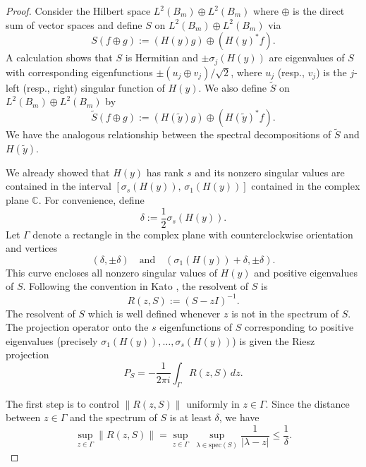 \documentclass[11pt]{article}
\theoremstyle{definition}
\numberwithin{theorem}{section}
\numberwithin{lemma}{section}
\numberwithin{equation}{section}
\def\C{\mathbb{C}}
\renewcommand{\tilde}{\widetilde}
\def\andspace{\quad\text{and}\quad}
\numberwithin{equation}{section}
\begin{document}
\begin{proof}
		Consider the Hilbert space $L^2(B_m)\oplus L^2(B_m)$ where $\oplus$ is the direct sum of vector spaces and define $S$ on $L^2(B_m)\oplus L^2(B_m)$ via 
		$$
		S(f\oplus g):= (H(y) g) \oplus (H(y)^* f).
		$$
		A calculation shows that $S$ is Hermitian and $\pm \sigma_j(H(y))$ are eigenvalues of $S$ with corresponding eigenfunctions $\pm (u_j \oplus v_j)/\sqrt 2$, where $u_j$ (resp., $v_j$) is the $j$-left (resp., right) singular function of $H(y)$. We also define $\tilde S$ on $L^2(B_m)\oplus L^2(B_m)$ by 
		$$
		\tilde S(f\oplus g):= (H(\tilde y) g) \oplus (H(\tilde y)^* f).
		$$
		We have the analogous relationship between the spectral decompositions of $\tilde S$ and $H(\tilde y)$. 
		
		We already showed that $H(y)$ has rank $s$ and its nonzero singular values are contained in the interval $[\sigma_s(H(y)), \, \sigma_1(H(y))]$ contained in the complex plane $\C$. For convenience, define 
		$$
		\delta:=\frac 12 \sigma_s(H(y)).
		$$ 
		Let $\Gamma$ denote a rectangle in the complex plane with counterclockwise orientation and vertices 
		$$
		(\delta, \pm \delta) \andspace
		(\sigma_1(H(y))+\delta, \pm \delta).
		$$
		This curve encloses all nonzero singular values of $H(y)$ and positive eigenvalues of $S$. Following the convention in Kato \cite{kato2013perturbation}, the resolvent of $S$ is 
		$$
		R(z,S):=(S-z I)^{-1}.
		$$ 
		The resolvent of $S$ which is well defined whenever $z$ is not in the spectrum of $S$. The projection operator onto the $s$ eigenfunctions of $S$ corresponding to positive eigenvalues (precisely $\sigma_1(H(y)), \dots, \sigma_s(H(y))$) is given the Riesz projection
		\begin{equation*}
			P_S = - \frac{1}{2\pi i}\int_\Gamma R(z,S)\, dz.
		\end{equation*} 
		
		The first step is to control $\|R(z,S)\|$ uniformly in $z\in \Gamma$. Since the distance between $z\in \Gamma$ and the spectrum of $S$ is at least $\delta$, we have
		\begin{equation}
			\label{eq:resolvent1}
			\sup_{z\in \Gamma} \|R(z,S)\|
			= \sup_{z\in \Gamma} \  \sup_{\lambda \in \text{spec}(S)} \frac{1}{|\lambda-z|}
			\leq \frac 1 \delta. 
		\end{equation}
		

\end{proof}
\end{document}
